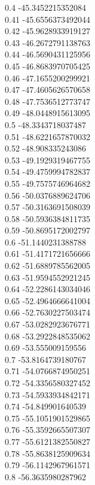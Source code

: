 {0.4	-45.3452215352084\\
0.41	-45.6556373492044\\
0.42	-45.9628933919127\\
0.43	-46.2672791138763\\
0.44	-46.5690431125956\\
0.45	-46.8683970705425\\
0.46	-47.1655200299921\\
0.47	-47.4605626570658\\
0.48	-47.7536512773747\\
0.49	-48.0448915613095\\
0.5	-48.3343718037487\\
0.51	-48.6221657870032\\
0.52	-48.908335243086\\
0.53	-49.1929319467755\\
0.54	-49.4759994782837\\
0.55	-49.7575746964682\\
0.56	-50.0376889624706\\
0.57	-50.3163691508039\\
0.58	-50.5936384811735\\
0.59	-50.8695172002797\\
0.6	-51.1440231388788\\
0.61	-51.4171721656666\\
0.62	-51.6889785562005\\
0.63	-51.9594552921245\\
0.64	-52.2286143034046\\
0.65	-52.4964666641004\\
0.66	-52.7630227503474\\
0.67	-53.0282923676771\\
0.68	-53.2922848535062\\
0.69	-53.555009159556\\
0.7	-53.8164739180767\\
0.71	-54.0766874950251\\
0.72	-54.3356580327452\\
0.73	-54.5933934842171\\
0.74	-54.849901640539\\
0.75	-55.1051901529865\\
0.76	-55.3592665507307\\
0.77	-55.6121382550827\\
0.78	-55.8638125909634\\
0.79	-56.1142967961571\\
0.8	-56.3635980287962\\
}
